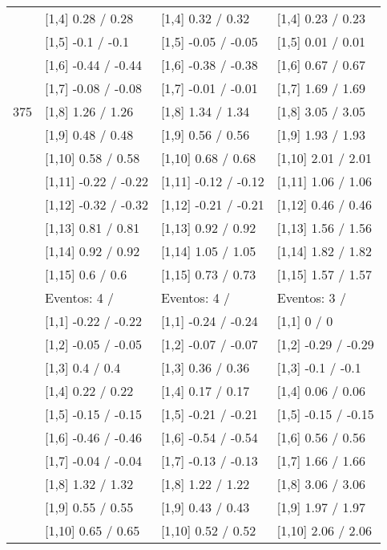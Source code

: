 \begin{table}
\begin{tabular}[t]{llll}
\addlinespace
 & {}[1,4] 0.28  / 0.28 & {}[1,4] 0.32  / 0.32 & {}[1,4] 0.23  / 0.23\\
 & {}[1,5] -0.1  / -0.1 & {}[1,5] -0.05  / -0.05 & {}[1,5] 0.01  / 0.01\\
 & {}[1,6] -0.44  / -0.44 & {}[1,6] -0.38  / -0.38 & {}[1,6] 0.67  / 0.67\\
 & {}[1,7] -0.08  / -0.08 & {}[1,7] -0.01  / -0.01 & {}[1,7] 1.69  / 1.69\\
375 & {}[1,8] 1.26  / 1.26 & {}[1,8] 1.34  / 1.34 & {}[1,8] 3.05  / 3.05\\
\addlinespace
 & {}[1,9] 0.48  / 0.48 & {}[1,9] 0.56  / 0.56 & {}[1,9] 1.93  / 1.93\\
 & {}[1,10] 0.58  / 0.58 & {}[1,10] 0.68  / 0.68 & {}[1,10] 2.01  / 2.01\\
 & {}[1,11] -0.22  / -0.22 & {}[1,11] -0.12  / -0.12 & {}[1,11] 1.06  / 1.06\\
 & {}[1,12] -0.32  / -0.32 & {}[1,12] -0.21  / -0.21 & {}[1,12] 0.46  / 0.46\\
 & {}[1,13] 0.81  / 0.81 & {}[1,13] 0.92  / 0.92 & {}[1,13] 1.56  / 1.56\\
\addlinespace
 & {}[1,14] 0.92  / 0.92 & {}[1,14] 1.05  / 1.05 & {}[1,14] 1.82  / 1.82\\
 & {}[1,15] 0.6  / 0.6 & {}[1,15] 0.73  / 0.73 & {}[1,15] 1.57  / 1.57\\
 & Eventos:  4 / & Eventos:  4 / & Eventos:  3 /\\
 & {}[1,1] -0.22  / -0.22 & {}[1,1] -0.24  / -0.24 & {}[1,1] 0  / 0\\
 & {}[1,2] -0.05  / -0.05 & {}[1,2] -0.07  / -0.07 & {}[1,2] -0.29  / -0.29\\
\addlinespace
 & {}[1,3] 0.4  / 0.4 & {}[1,3] 0.36  / 0.36 & {}[1,3] -0.1  / -0.1\\
 & {}[1,4] 0.22  / 0.22 & {}[1,4] 0.17  / 0.17 & {}[1,4] 0.06  / 0.06\\
 & {}[1,5] -0.15  / -0.15 & {}[1,5] -0.21  / -0.21 & {}[1,5] -0.15  / -0.15\\
 & {}[1,6] -0.46  / -0.46 & {}[1,6] -0.54  / -0.54 & {}[1,6] 0.56  / 0.56\\
 & {}[1,7] -0.04  / -0.04 & {}[1,7] -0.13  / -0.13 & {}[1,7] 1.66  / 1.66\\
\addlinespace
500 & {}[1,8] 1.32  / 1.32 & {}[1,8] 1.22  / 1.22 & {}[1,8] 3.06  / 3.06\\
 & {}[1,9] 0.55  / 0.55 & {}[1,9] 0.43  / 0.43 & {}[1,9] 1.97  / 1.97\\
 & {}[1,10] 0.65  / 0.65 & {}[1,10] 0.52  / 0.52 & {}[1,10] 2.06  / 2.06\\

\end{tabular}
\end{table}
